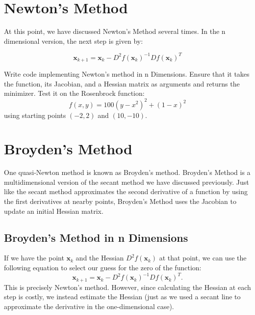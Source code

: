 

\section*{Newton's Method}
At this point, we have discussed Newton's Method several times. In the n dimensional version,
the next step is given by:

\begin{equation} \label{Eq:BasicNewton}
\mathbf{x}_{k+1} = \mathbf{x}_k - D^2f(\mathbf{x}_k)^{-1}Df(\mathbf{x}_k)^T
\end{equation}

\begin{problem}
Write code implementing Newton's method in n Dimensions. Ensure that it takes
the function, its Jacobian, and a Hessian matrix as arguments and returns the 
minimizer. Test it on the Rosenbrock function:
\[
f(x,y) = 100(y-x^2)^2 + (1-x)^2
\]
using starting points $(-2,2)$ and $(10,-10)$.
\end{problem}

\section*{Broyden's Method}
One quasi-Newton method is known as Broyden's method. Broyden's Method is a
multidimensional version of the secant method we have discussed previously.
Just like the secant method approximates the second derivative of a function by
using the first derivatives at nearby points, Broyden's Method uses
the Jacobian to update an initial Hessian matrix.

\subsection*{Broyden's Method in n Dimensions}

If we have the point $\mathbf{x}_k$ and the Hessian $D^2f(\mathbf{x}_k)$ at that point, we can use the
following equation to select our guess for the zero of the function:
\begin{equation} \label{Eq:BroydenSolve}
\mathbf{x}_{k+1} = \mathbf{x}_k-D^2f(\mathbf{x}_k)^{-1}Df(\mathbf{x}_k)^T.
\end{equation}
This is precisely Newton's method. However, since calculating the Hessian at each step is costly, we instead estimate the Hessian (just as we used a secant line to approximate the derivative in the one-dimensional case).

